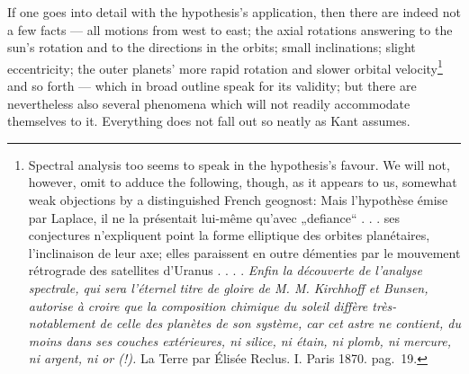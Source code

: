 \documentclass[12pt,a4paper]{book}
\begin{document}
If one goes into detail with the hypothesis's application, then there are indeed not a few facts --- all
motions from west to east; the axial rotations answering to the sun's
rotation and to the directions in the orbits; small inclinations; slight eccentricity; the outer planets'
more rapid rotation and slower orbital
velocity\footnote{%
Spectral analysis too seems to speak in the hypothesis's favour. We will not, however, omit to adduce the
following, though, as it appears to us, somewhat weak objections by a distinguished French geognost: Mais
l'hypothèse émise par Laplace, il ne la présentait lui-même qu'avec „defiance“ . . . ses conjectures
n'expliquent point la forme elliptique des orbites planétaires, l'inclinaison de leur axe; elles paraissent
en outre démenties par le mouvement rétrograde des satellites d'Uranus
. . . . \textit{Enfin la découverte de l'analyse spectrale, qui sera l'éternel titre de gloire de M. M.
Kirchhoff et Bunsen, autorise à croire que la composition chimique du soleil diffère
très-notablement de celle des planètes de son système, car cet astre ne contient, du moins dans ses couches
extérieures, ni silice, ni étain, ni plomb, ni mercure, ni argent, ni or (!).} La Terre par Élisée Reclus.
I. Paris 1870. pag.\ 19.}
and so forth --- which in broad outline speak for its validity; but there are nevertheless also several
phenomena which will not readily accommodate themselves to
it. Everything does not fall out so neatly as Kant assumes.
\end{document}
